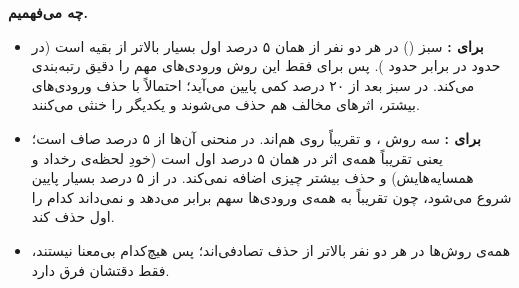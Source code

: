 \textbf{چه می‌فهمیم.}
\begin{itemize}
\item \textbf{برای :} سبز () در هر دو نفر از همان ۵ درصد اول بسیار بالاتر از بقیه است (در  حدود  در برابر حدود ). پس برای  فقط این روش ورودی‌های مهم را دقیق رتبه‌بندی می‌کند. در  سبز بعد از ۲۰ درصد کمی پایین می‌آید؛ احتمالاً با حذف ورودی‌های بیشتر، اثرهای مخالف هم حذف می‌شوند و یکدیگر را خنثی می‌کنند.
\item \textbf{برای :} سه روش ،  و  تقریباً روی هم‌اند. در  منحنی آن‌ها از ۵ درصد صاف است؛ یعنی تقریباً همه‌ی اثر در همان ۵ درصد اول است (خودِ لحظه‌ی رخداد و همسایه‌هایش) و حذف بیشتر چیزی اضافه نمی‌کند.  در  از ۵ درصد بسیار پایین شروع می‌شود، چون تقریباً به همه‌ی ورودی‌ها سهم برابر می‌دهد و نمی‌داند کدام را اول حذف کند.
\item همه‌ی روش‌ها در هر دو نفر بالاتر از حذف تصادفی‌اند؛ پس هیچ‌کدام بی‌معنا نیستند، فقط دقتشان فرق دارد.
\end{itemize}

\clearpage
